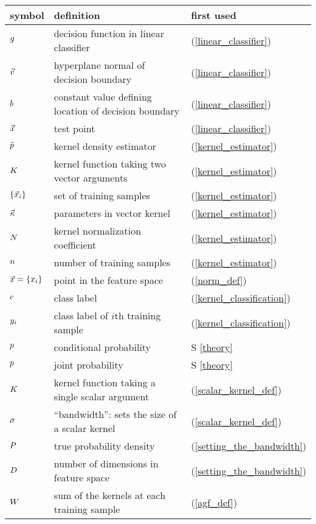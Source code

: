 

\begin{tabular}{lll}
symbol & definition & first used \\ \hline
	$g$ & decision function in linear classifier & (\ref{linear_classifier})\\
	$\vec v$ & hyperplane normal of decision boundary & (\ref{linear_classifier})\\
	$b$ & constant value defining location of decision boundary & (\ref{linear_classifier})\\
	$\vec {x}$ & test point & (\ref{linear_classifier})\\
	$\tilde p$ & kernel density estimator & (\ref{kernel_estimator})\\
	$K$ & kernel function taking two vector arguments & (\ref{kernel_estimator})\\
	$\lbrace \vec {x}_i \rbrace$ & set of training samples & (\ref{kernel_estimator})\\
	$\vec \kappa$ & parameters in vector kernel & (\ref{kernel_estimator})\\
	$N$ & kernel normalization coefficient & (\ref{kernel_estimator})\\
	$n$ & number of training samples & (\ref{kernel_estimator})\\
	$\vec {x}=\lbrace x_i \rbrace$ & point in the feature space & (\ref{norm_def})\\
	$c$ & class label & (\ref{kernel_classification})\\
	$y_i$ & class label of $i$th training sample & (\ref{kernel_classification})\\
	$p$ & conditional probability & S \ref{theory}\\
	$p$ & joint probability & S \ref{theory} \\
	$K$ & kernel function taking a single scalar argument & (\ref{scalar_kernel_def})\\
	$\sigma$ & ``bandwidth'': sets the size of a scalar kernel & (\ref{scalar_kernel_def})\\
	$P$ & true probability density & (\ref{setting_the_bandwidth})\\
	$D$ & number of dimensions in feature space & (\ref{setting_the_bandwidth})\\
	$W$ & sum of the kernels at each training sample & (\ref{agf_def})\\

\end{tabular}
